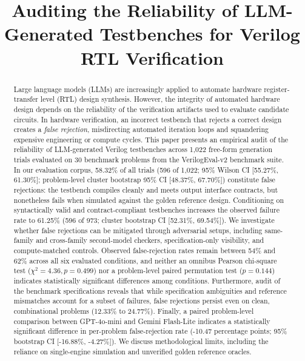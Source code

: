 \documentclass[conference]{IEEEtran}
\begin{document}
\title{Auditing the Reliability of LLM-Generated Testbenches for Verilog RTL Verification}

\author{
}

\maketitle

\begin{abstract}
Large language models (LLMs) are increasingly applied to automate hardware register-transfer level (RTL) design synthesis. However, the integrity of automated hardware design depends on the reliability of the verification artifacts used to evaluate candidate circuits. In hardware verification, an incorrect testbench that rejects a correct design creates a \textit{false rejection}, misdirecting automated iteration loops and squandering expensive engineering or compute cycles. This paper presents an empirical audit of the reliability of LLM-generated Verilog testbenches across 1,022 free-form generation trials evaluated on 30 benchmark problems from the VerilogEval-v2 benchmark suite. In our evaluation corpus, 58.32\% of all trials (596 of 1,022; 95\% Wilson CI [55.27\%, 61.30\%]; problem-level cluster bootstrap 95\% CI [48.37\%, 67.70\%]) constitute false rejections: the testbench compiles cleanly and meets output interface contracts, but nonetheless fails when simulated against the golden reference design. Conditioning on syntactically valid and contract-compliant testbenches increases the observed failure rate to 61.25\% (596 of 973; cluster bootstrap CI [52.31\%, 69.54\%]). We investigate whether false rejections can be mitigated through adversarial setups, including same-family and cross-family second-model checkers, specification-only visibility, and compute-matched controls. Observed false-rejection rates remain between 54\% and 62\% across all six evaluated conditions, and neither an omnibus Pearson chi-square test ($\chi^2 = 4.36, p = 0.499$) nor a problem-level paired permutation test ($p = 0.144$) indicates statistically significant differences among conditions. Furthermore, audit of the benchmark specifications reveals that while specification ambiguities and reference mismatches account for a subset of failures, false rejections persist even on clean, combinational problems (12.33\% to 24.77\%). Finally, a paired problem-level comparison between GPT-4o-mini and Gemini Flash-Lite indicates a statistically significant difference in per-problem false-rejection rate (-10.47 percentage points; 95\% bootstrap CI [-16.88\%, -4.27\%]). We discuss methodological limits, including the reliance on single-engine simulation and unverified golden reference oracles.
\end{abstract}
\end{document}

